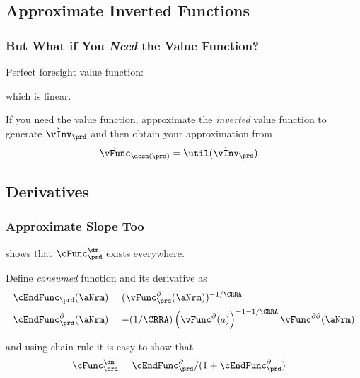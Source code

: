 \documentclass{beamer}
\begin{document}
\subsection{Approximate Inverted Functions}
\begin{frame}%
\frametitle{But What if You {\it Need} the Value Function?}

Perfect foresight value function:

which is linear.  

\medskip\medskip
\pause If you need the value function, approximate the {\it inverted} value function to generate $\grave{\vInv}_{\prd}$ 
and then obtain your approximation from 
\begin{equation}\begin{gathered}\begin{aligned}
  \grave{\vFunc}_{\dcsn(\prd)}  & = \util(\grave{\vInv}_{\prd})
\end{aligned}\end{gathered}\end{equation}


\end{frame}

\subsection{Derivatives}
\begin{frame}
\frametitle{Approximate Slope Too}

\cite{BufferStockTheory} shows that $\cFunc^{\dm}_{\prd}$ exists everywhere.
\medskip

\pause 
Define {\it consumed} function and its derivative as 
\begin{equation}\begin{gathered}\begin{aligned}
  \cEndFunc_{\prd}(\aNrm)  & = (\vFunc^{\partial}_{\prd}(\aNrm))^{-1/\CRRA}
\\ \cEndFunc_{\prd}^{\partial}(\aNrm)  & = -(1/\CRRA)\left(\vFunc^{\partial}(a)\right)^{-1-1/\CRRA} \vFunc^{\partial\partial}(\aNrm) 
\end{aligned}\end{gathered}\end{equation}

\pause 
and using chain rule it is easy to show that
\begin{equation}\begin{gathered}\begin{aligned}
 \cFunc^{\dm}_{\prd}  & = \cEndFunc^{\partial}_{\prd}/(1+\cEndFunc^{\partial}_{\prd})
\end{aligned}\end{gathered}\end{equation}

\end{frame}
\end{document}
